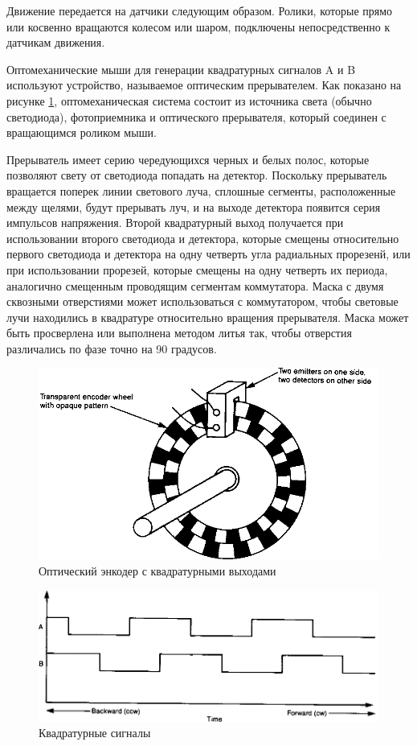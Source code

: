 \documentclass[11pt, a4paper]{article}
\begin{document}
Движение передается на датчики следующим образом. Ролики, которые прямо или косвенно вращаются колесом или шаром, подключены непосредственно к датчикам движения.


Оптомеханические мыши для генерации квадратурных сигналов A и B используют устройство, называемое оптическим прерывателем. Как показано на рисунке \ref{fig:theoryQuadEncoder}, оптомеханическая система состоит из источника света (обычно светодиода), фотоприемника и оптического прерывателя, который соединен с вращающимся роликом мыши.

Прерыватель имеет серию чередующихся черных и белых полос, которые позволяют свету от светодиода попадать на детектор. Поскольку прерыватель вращается поперек линии светового луча, сплошные сегменты, расположенные между щелями, будут прерывать луч, и на выходе детектора появится серия импульсов напряжения. Второй квадратурный выход получается при использовании второго светодиода и детектора, которые смещены относительно первого светодиода и детектора на одну четверть угла радиальных прорезенй, или при использовании прорезей, которые смещены на одну четверть их периода, аналогично смещенным проводящим сегментам коммутатора. Маска с двумя сквозными отверстиями может использоваться с коммутатором, чтобы световые лучи находились в квадратуре относительно вращения прерывателя. Маска может быть просверлена или выполнена методом литья так, чтобы отверстия различались по фазе точно на 90 градусов.

\begin{figure}[h]
    \centering
    \includegraphics[width=0.5\linewidth]{theory_mech/2.76.PNG}
    \caption{Оптический энкодер с квадратурными выходами}
    \label{fig:theoryQuadEncoder}
\end{figure}

\begin{figure}[h]
    \centering
    \includegraphics[width=0.5\linewidth]{theory_mech/2.77.PNG}
    \caption{Квадратурные сигналы}
    \label{fig:theoryQuadDiag}
\end{figure}
\end{document}
